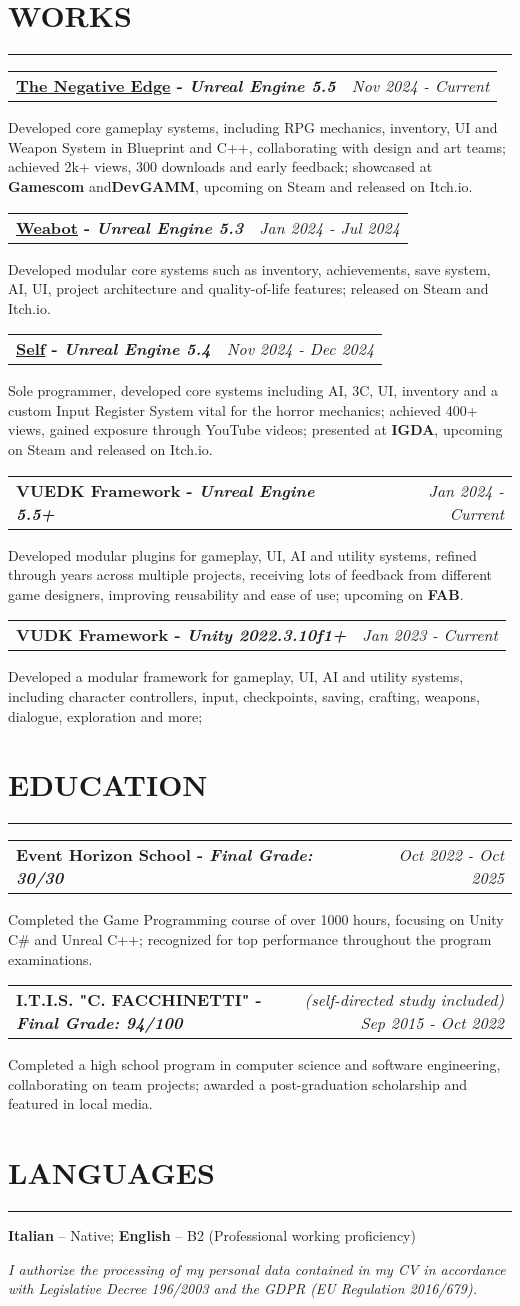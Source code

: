 \documentclass[7pt]{article}
\makeatletter
\newcommand{\sectionline}{\vspace{-0.3em}\noindent\rule{\linewidth}{0.15pt}\vspace{0.08em}}
\newcommand{\project}[3]{%
    \noindent
    \begin{tabular*}{\textwidth}{@{\extracolsep{\fill}} l r}
    \textbf{#1} & \textit{#2} \\
    \end{tabular*}
    \vspace{0.04em}
    #3
    \vspace{0.08em}\par
}
\newcommand{\cvsection}[2]{%
    \vspace{-.6em}
    \section*{{\large\textbf{\MakeUppercase{#1}}}}
    \vspace{-0.5em}
    \sectionline
    \vspace{-0.15em}
    #2
}
\newcommand{\footerdescription}[1]{%
    \vspace{-0.25em}
    \begin{center}
    \scriptsize
    \setlength{\parskip}{0pt}
    \setlength{\parindent}{0pt}
    \textit{#1}
    \end{center}
    \vspace{-0.25em}
}
\makeatother
\begin{document}
    \cvsection{WORKS}{
        \project{\href{https://eventhorizonschool.itch.io/the-negative-edge}{The Negative Edge} - \textit{Unreal Engine 5.5}}{Nov 2024 - Current}{
            Developed core gameplay systems, including RPG mechanics, inventory, UI and Weapon System in Blueprint and C++, collaborating with design and art teams;
            achieved 2k+ views, 300 downloads and early feedback;
            showcased at \textbf{Gamescom} and\textbf{DevGAMM}, upcoming on Steam and released on Itch.io.
        }
        \project{\href{https://store.steampowered.com/app/4075260/Weabot/}{Weabot} - \textit{Unreal Engine 5.3}}{Jan 2024 - Jul 2024}{
            Developed modular core systems such as inventory, achievements, save system, AI, UI, project architecture and quality-of-life features;
            released on Steam and Itch.io.
        }
        \project{\href{https://jacedxxm.itch.io/self}{Self} - \textit{Unreal Engine 5.4}}{Nov 2024 - Dec 2024}{
            Sole programmer, developed core systems including AI, 3C, UI, inventory and a custom Input Register System vital for the horror mechanics;
            achieved 400+ views, gained exposure through YouTube videos; presented at \textbf{IGDA}, upcoming on Steam and released on Itch.io.
        }
        \project{VUEDK Framework - \textit{Unreal Engine 5.5+}}{Jan 2024 - Current}{
            Developed modular plugins for gameplay, UI, AI and utility systems, refined through years across multiple projects,
            receiving lots of feedback from different game designers, improving reusability and ease of use; upcoming on \textbf{FAB}.
        }
        \project{VUDK Framework - \textit{Unity 2022.3.10f1+}}{Jan 2023 - Current}{
            Developed a modular framework for gameplay, UI, AI and utility systems, including character controllers, input, checkpoints, saving, crafting, weapons, dialogue, exploration and more;
        }
    }

    \cvsection{EDUCATION}{
        \project{Event Horizon School - \textit{Final Grade: 30/30}}{Oct 2022 - Oct 2025}{
            Completed the Game Programming course of over 1000 hours, focusing on Unity C\# and Unreal C++;
            recognized for top performance throughout the program examinations.
        }
        \project{I.T.I.S. "C. FACCHINETTI" - \textit{Final Grade: 94/100}}{(self-directed study included) Sep 2015 - Oct 2022}{
            Completed a high school program in computer science and software engineering, collaborating on team projects;
            awarded a post-graduation scholarship and featured in local media.
        }
    }

    \cvsection{LANGUAGES}{
        \textbf{Italian} – Native; \textbf{English} – B2 (Professional working proficiency)
    }

    \footerdescription{
        I authorize the processing of my personal data contained in my CV in accordance with Legislative Decree 196/2003 and the GDPR (EU Regulation 2016/679).
    }
\end{document}
